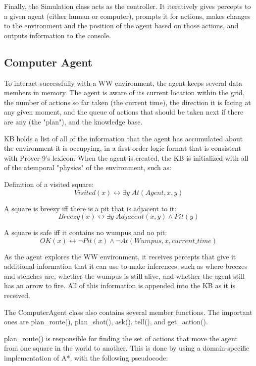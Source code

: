 \documentclass[10 pt.]{article}
\begin{document}
Finally, the Simulation class acts as the controller. It iteratively gives
percepts to a given agent (either human or computer), prompts it for actions,
makes changes to the environment and the position of the agent based on those
actions, and outputs information to the console.

\subsection{Computer Agent}
To interact successfully with a WW environment, the agent keeps several data
members in memory. The agent is aware of its current location within the grid,
the number of actions so far taken (the current time), the direction it is
facing at any given moment, and the queue of actions that should be taken next
if there are any (the "plan"), and the knowledge base.

KB holds a list of all of the information that the agent has
accumulated about the environment it is occupying, in a first-order logic
format that is consistent with Prover-9's lexicon. When the agent
is created, the KB is initialized with all of the atemporal "physics" of the
environment, such as:

\vspace{1 pc} \noindent Definition of a visited square:
\[
Visited(x) \leftrightarrow \exists y \; At(Agent, x, y)
\]

\vspace{1 pc} \noindent A square is breezy iff there is a pit that is adjacent to it:
\[
Breezy(x) \leftrightarrow \exists y \; Adjacent(x,y) \wedge Pit(y)
\]

\vspace{1 pc} \noindent A square is safe iff it contains no wumpus and no pit:
\[
OK(x) \leftrightarrow \neg Pit(x) \wedge \neg At(Wumpus, x, current\_time)
\] 

As the agent explores the WW environment, it receives percepts that give it
additional information that it can use to make inferences, such as where
breezes and stenches are, whether the wumpus is still alive, and whether the
agent still has an arrow to fire. All of this information is appended into the
KB as it is received.

\vspace{1 pc} The ComputerAgent class also contains several member functions.
The important ones are plan\_route(), plan\_shot(), ask(), tell(), and
get\_action().

plan\_route() is responsible for finding the set of actions that move the agent
from one square in the world to another. This is done by using a
domain-specific implementation of A*, with the following pseudocode:
\end{document}
